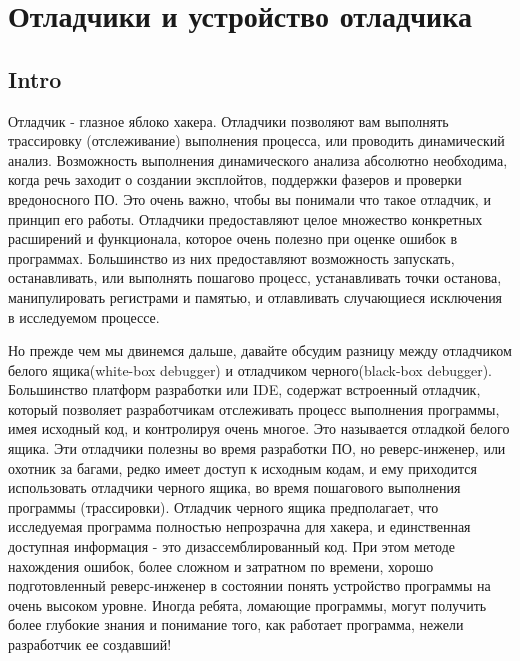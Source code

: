 \documentclass[12pt]{book}
\begin{document}
\chapter{Отладчики и устройство отладчика}
\section*{Intro}

Отладчик - глазное яблоко хакера. Отладчики позволяют вам выполнять трассировку (отслеживание) выполнения процесса, или проводить динамический анализ. Возможность выполнения динамического анализа абсолютно необходима, когда речь заходит о создании эксплойтов, поддержки фазеров и проверки вредоносного ПО. Это очень важно, чтобы вы понимали что такое отладчик, и принцип его работы. Отладчики предоставляют целое множество конкретных расширений и функционала, которое очень полезно при оценке ошибок в программах. Большинство из них предоставляют возможность запускать, останавливать, или выполнять пошагово процесс, устанавливать точки останова, манипулировать регистрами и памятью, и отлавливать случающиеся исключения в исследуемом процессе.

Но прежде чем мы двинемся дальше, давайте обсудим разницу между отладчиком белого ящика(white-box debugger) и отладчиком черного(black-box debugger). Большинство платформ разработки или IDE, содержат встроенный отладчик, который позволяет разработчикам отслеживать процесс выполнения программы, имея исходный код, и контролируя очень многое. Это называется отладкой белого ящика. Эти отладчики полезны во время разработки ПО, но реверс-инженер, или охотник за багами, редко имеет доступ к исходным кодам, и ему приходится использовать отладчики черного ящика, во время пошагового выполнения программы (трассировки). Отладчик черного ящика предполагает, что исследуемая программа полностью непрозрачна для хакера, и единственная доступная информация - это дизассемблированный код. При этом методе нахождения ошибок, более сложном и затратном по времени, хорошо подготовленный реверс-инженер в состоянии понять устройство программы на очень высоком уровне. Иногда ребята, ломающие программы, могут получить более глубокие знания и понимание того, как работает программа, нежели разработчик ее создавший!
\end{document}
